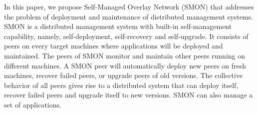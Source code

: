 
In this paper, we propose Self-Managed Overlay Network
(SMON) that addresses the problem of deployment and
maintenance of distributed management systems.  SMON is a
distributed management system with built-in self-management
capability, namely, self-deployment, self-recovery and
self-upgrade. It consists of peers on every target machines
where applications will be deployed and maintained. The
peers of SMON monitor and maintain other peers running on
different machines. A SMON peer will automatically deploy
new peers on fresh machines, recover failed peers, or
upgrade peers of old versions. The collective behavior of
all peers gives rise to a distributed system that can deploy
itself, recover failed peers and upgrade itself to new
versions. SMON can also manage a set of applications.


